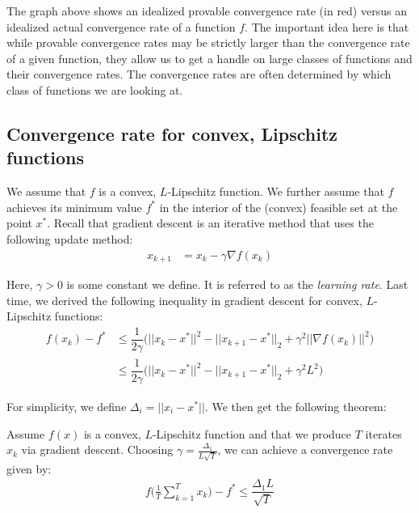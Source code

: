 \documentclass[12pt]{report}
\begin{document}
The graph above shows an idealized provable convergence rate (in red) versus an idealized actual convergence rate of a function $f$. The important idea here is that while provable convergence rates may be strictly larger than the convergence rate of a given function, they allow us to get a handle on large classes of functions and their convergence rates. The convergence rates are often determined by which class of functions we are looking at.

\subsection{Convergence rate for convex, Lipschitz functions}

We assume that $f$ is a convex, $L$-Lipschitz function. We further assume that $f$ achieves its minimum value $f^*$ in the interior of the (convex) feasible set at the point $x^*$. Recall that gradient descent is an iterative method that uses the following update method:
\begin{align*}
x_{k+1} &= x_k - \gamma \nabla f(x_k)\end{align*}

Here, $\gamma > 0$ is some constant we define. It is referred to as the {\it learning rate}. Last time, we derived the following inequality in gradient descent for convex, $L$-Lipschitz functions:
\begin{align*}
f(x_k) - f^* &\leq \dfrac{1}{2\gamma}\bigg(||x_k-x^*||^2 - ||x_{k+1}-x^*||_2 +\gamma^2||\nabla f(x_k)||^2\bigg)\\
&\leq \dfrac{1}{2\gamma}\bigg(||x_k-x^*||^2 - ||x_{k+1}-x^*||_2 + \gamma^2L^2\bigg)
\end{align*}

For simplicity, we define $\Delta_i = ||x_i-x^*||$. We then get the following theorem:

\begin{theorem}
Assume $f(x)$ is a convex, $L$-Lipschitz function and that we produce $T$ iterates $x_k$ via gradient descent. Choosing $\gamma = \frac{\Delta_1}{L\sqrt{T}}$, we can achieve a convergence rate given by:
\begin{align*}
f\bigg(\frac{1}{T}\sum_{k=1}^T x_k\bigg) - f^* \leq \dfrac{\Delta_1 L}{\sqrt{T}}\end{align*}
\end{theorem}
\end{document}
